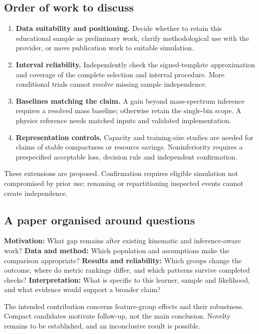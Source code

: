 \documentclass[11pt,a4paper]{article}
\begin{document}
\subsection*{Order of work to discuss}
\begin{enumerate}
\setlength{\itemsep}{0.15em}\setlength{\parskip}{0pt}\setlength{\parsep}{0pt}
\item \textbf{Data suitability and positioning.} Decide whether to retain this
educational sample as preliminary work, clarify methodological use with the
provider, or move publication work to suitable simulation.
\item \textbf{Interval reliability.} Independently check the signed-template
approximation and coverage of the complete selection and interval procedure.
More conditional trials cannot resolve missing sample independence.
\item \textbf{Baselines matching the claim.} A gain beyond mass-spectrum inference
requires a resolved mass baseline; otherwise retain the single-bin scope.
A physics reference needs matched inputs and validated implementation.
\item \textbf{Representation controls.} Capacity and training-size studies are
needed for claims of stable compactness or resource savings. Noninferiority
requires a prespecified acceptable loss, decision rule and independent confirmation.
\end{enumerate}
These extensions are proposed. Confirmation requires eligible simulation not
compromised by prior use; renaming or repartitioning inspected events cannot
create independence.

\subsection*{A paper organised around questions}
\textbf{Motivation:} What gap remains after existing kinematic and inference-aware
work? \textbf{Data and method:} Which population and assumptions make the comparison
appropriate? \textbf{Results and reliability:} Which groups change the outcome,
where do metric rankings differ, and which patterns survive completed checks?
\textbf{Interpretation:} What is specific to this learner, sample and likelihood,
and what evidence would support a broader claim?

The intended contribution concerns feature-group effects and their robustness.
Compact candidates motivate follow-up, not the main conclusion. Novelty remains
to be established, and an inconclusive result is possible.
\end{document}
